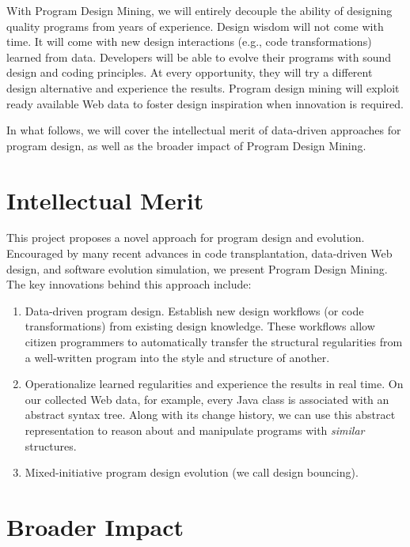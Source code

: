 With Program Design Mining, we will entirely decouple the ability of 
designing quality programs from years of experience. Design wisdom will 
not come with time. It will come with new design interactions (e.g., code 
transformations) learned from data. Developers will be able to evolve 
their programs with sound design and coding principles. At every 
opportunity, they will try a different design alternative and experience 
the results. Program design mining will exploit ready available Web data 
to foster design inspiration when innovation is required.

In what follows, we will cover the intellectual merit of data-driven 
approaches for program design, as well as the broader impact of Program 
Design Mining.

\section*{Intellectual Merit} %
\label{sec:merit}

This project proposes a novel approach for program design and 
evolution. Encouraged by many recent advances in code transplantation, 
data-driven Web design, and software evolution simulation, we 
present Program Design Mining. The key innovations behind this 
approach include:

\begin{enumerate}
	\item Data-driven program design. Establish new design workflows (or code 
	transformations) from existing design knowledge. These workflows allow 
	citizen programmers to automatically transfer the structural regularities 
	from a well-written program into the style and structure of another.  
	\item Operationalize learned regularities and experience the results in 
	real time. On our collected Web data, for example, every Java class is 
	associated with an abstract syntax tree. Along with its change history, 
	we can use this abstract representation to reason about and manipulate 
	programs with \textit{similar} structures.
	\item Mixed-initiative program design evolution (we call design bouncing).     
\end{enumerate}

\section*{Broader Impact} %
\label{sec:impact}

